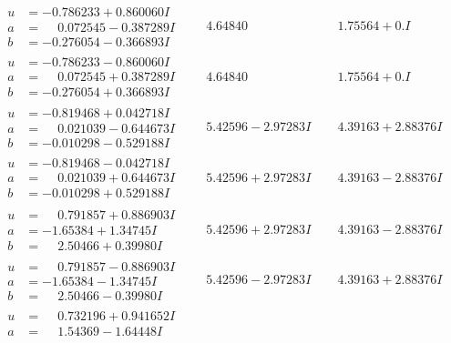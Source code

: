 \documentclass[1p]{elsarticle_modified}
\theoremstyle{definition}
\begin{document}
$$\begin{array}{c|c|c}
\begin{aligned}
u &= -0.786233 + 0.860060 I \\
a &= \phantom{-}0.072545 - 0.387289 I \\
b &= -0.276054 - 0.366893 I\end{aligned}
 & \phantom{-}4.64840\phantom{ +0.000000I} & \phantom{-}1.75564 + 0. I\phantom{ +0.000000I} \\ \hline\begin{aligned}
u &= -0.786233 - 0.860060 I \\
a &= \phantom{-}0.072545 + 0.387289 I \\
b &= -0.276054 + 0.366893 I\end{aligned}
 & \phantom{-}4.64840\phantom{ +0.000000I} & \phantom{-}1.75564 + 0. I\phantom{ +0.000000I} \\ \hline\begin{aligned}
u &= -0.819468 + 0.042718 I \\
a &= \phantom{-}0.021039 - 0.644673 I \\
b &= -0.010298 - 0.529188 I\end{aligned}
 & \phantom{-}5.42596 - 2.97283 I & \phantom{-}4.39163 + 2.88376 I \\ \hline\begin{aligned}
u &= -0.819468 - 0.042718 I \\
a &= \phantom{-}0.021039 + 0.644673 I \\
b &= -0.010298 + 0.529188 I\end{aligned}
 & \phantom{-}5.42596 + 2.97283 I & \phantom{-}4.39163 - 2.88376 I \\ \hline\begin{aligned}
u &= \phantom{-}0.791857 + 0.886903 I \\
a &= -1.65384 + 1.34745 I \\
b &= \phantom{-}2.50466 + 0.39980 I\end{aligned}
 & \phantom{-}5.42596 + 2.97283 I & \phantom{-}4.39163 - 2.88376 I \\ \hline\begin{aligned}
u &= \phantom{-}0.791857 - 0.886903 I \\
a &= -1.65384 - 1.34745 I \\
b &= \phantom{-}2.50466 - 0.39980 I\end{aligned}
 & \phantom{-}5.42596 - 2.97283 I & \phantom{-}4.39163 + 2.88376 I \\ \hline\begin{aligned}
u &= \phantom{-}0.732196 + 0.941652 I \\
a &= \phantom{-}1.54369 - 1.64448 I \\

\end{aligned}
\end{array}$$
\end{document}
